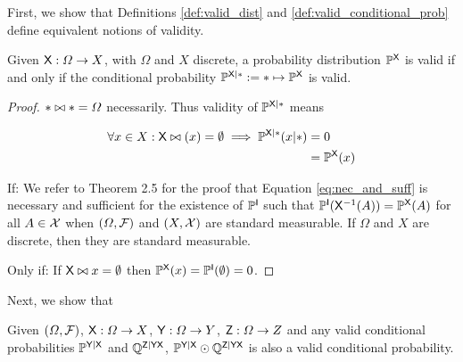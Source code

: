 First, we show that Definitions \ref{def:valid_dist} and \ref{def:valid_conditional_prob} define equivalent notions of validity.

\begin{lemma}\label{th:valid_agree}
Given $\mathsf{X}:\Omega\to X$, with $\Omega$ and $X$ discrete, a probability distribution $\mathbb{P}^{\mathsf{X}}$ is valid if and only if the conditional probability $\mathbb{P}^{\mathsf{X}|*}:=*\mapsto \mathbb{P}^{\mathsf{X}}$ is valid.
\end{lemma}

\begin{proof}
$*\bowtie *=\Omega$ necessarily. Thus validity of $\mathbb{P}^{\mathsf{X}|*}$ means 

\begin{align}
	\forall x\in X: \mathsf{X}\bowtie (x)=\emptyset \implies \mathbb{P}^{\mathsf{X}|*}(x|*)&=0\\
	&= \mathbb{P}^{\mathsf{X}}(x)\label{eq:nec_and_suff}
\end{align}

If: We refer to \citet{ershov_extension_1975} Theorem 2.5 for the proof that Equation \ref{eq:nec_and_suff} is necessary and sufficient for the existence of $\mathbb{P}^{\mathsf{I}}$ such that $\mathbb{P}^{\mathsf{I}}(\mathsf{X}^{-1}(A))=\mathbb{P}^{\mathsf{X}}(A)$ for all $A\in \mathcal{X}$ when $(\Omega,\mathcal{F})$ and $(X,\mathcal{X})$ are standard measurable. If $\Omega$ and $X$ are discrete, then they are standard measurable.

Only if: If $\mathsf{X}\bowtie x=\emptyset$ then $\mathbb{P}^{\mathsf{X}}(x)=\mathbb{P}^{\mathsf{I}}(\emptyset)=0$.
\end{proof}

Next, we show that 

\begin{theorem}\label{lem:valid_extendability}
Given $(\Omega,\mathcal{F})$, $\mathsf{X}:\Omega\to X$, $\mathsf{Y}:\Omega\to Y$, $\mathsf{Z}:\Omega\to Z$ and any valid conditional probabilities $\mathbb{P}^{\mathsf{Y}|\mathsf{X}}$ and $\mathbb{Q}^{\mathsf{Z}|\mathsf{Y}\mathsf{X}}$, $ \mathbb{P}^{\mathsf{Y}|\mathsf{X}}\odot \mathbb{Q}^{\mathsf{Z}|\mathsf{Y}\mathsf{X}}$ is also a valid conditional probability.
\end{theorem}

